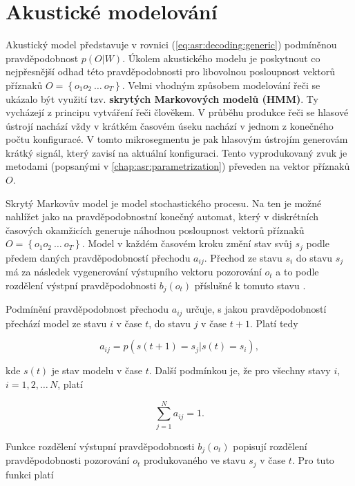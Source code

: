 \section{Akustické modelování}
\label{chap:asr:acoustic}

Akustický model představuje v rovnici (\ref{eq:asr:decoding:generic}) podmíněnou pravděpodobnost $p(O|W)$. Úkolem akustického modelu je poskytnout co nejpřesnější odhad této pravděpodobnosti pro libovolnou posloupnost vektorů příznaků $O = \left\{o_1 o_2\ \dots\ o_T\right\}$. Velmi vhodným způsobem modelování řeči se ukázalo být využití tzv. \textbf{skrytých Markovových modelů (HMM)}. Ty vycházejí z principu vytváření řeči člověkem. V průběhu produkce řeči se hlasové ústrojí nachází vždy v krátkém časovém úseku nachází v jednom z konečného počtu konfiguracé. V tomto mikrosegmentu je pak hlasovým ústrojím generovám krátký signál, který zavisí na aktuální konfiguraci. Tento vyprodukovaný zvuk je metodami (popsanými v \ref{chap:asr:parametrization}) převeden na vektor příznaků $O$.

Skrytý Markovův model je model stochastického procesu. Na ten je možné nahlížet jako na pravděpodobnostní konečný automat, který v diskrétních časových okamžicích generuje náhodnou posloupnost vektorů příznaků $O = \left\{o_1 o_2\ \dots\ o_T\right\}$. Model v každém časovém kroku změní stav svůj $s_j$ podle předem daných pravděpodobností přechodu $a_{ij}$. Přechod ze stavu $s_i$ do stavu $s_j$ má za následek vygenerování výstupního vektoru pozorování $o_t$ a to podle rozdělení výstpní pravděpodobnosti $b_j\left(o_t\right)$ příslušné k tomuto stavu \cite{Psutka2006}.

Podmínění pravděpodobnost přechodu $a_{ij}$ určuje, s jakou pravděpodobností přechází model ze stavu $i$ v čase $t$, do stavu $j$ v čase $t+1$. Platí tedy

\begin{equation}
  a_{ij} = p\left(s\left(t+1\right)=s_j|s\left(t\right)=s_i\right),
  \label{eq:asr:acoustic:conditional}
\end{equation}

\noindent kde $s\left(t\right)$ je stav modelu v čase $t$. Další podmínkou je, že pro všechny stavy $i$, $i=1,2,\dots\,N$, platí

\begin{equation}
  \sum_{j=1}^{N} a_{ij} = 1.
  \label{eq:asr:acoustic:state:condition}
\end{equation}

\noindent Funkce rozdělení výstupní pravděpodobnosti $b_j\left(o_t\right)$ popisují rozdělení pravděpodobnosti pozorování $o_t$ produkovaného ve stavu $s_j$ v čase $t$. Pro tuto funkci platí

